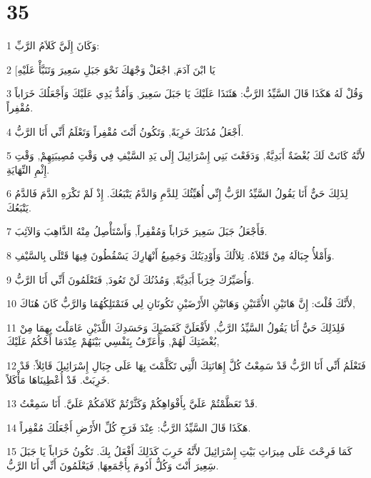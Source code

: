 \chapter{35}

\par 1 وَكَانَ إِلَيَّ كَلاَمُ الرَّبِّ:
\par 2 [يَا ابْنَ آدَمَ, اجْعَلْ وَجْهَكَ نَحْوَ جَبَلِ سَعِيرَ وَتَنَبَّأْ عَلَيْهِ
\par 3 وَقُلْ لَهُ هَكَذَا قَالَ السَّيِّدُ الرَّبُّ: هَئَنَذَا عَلَيْكَ يَا جَبَلَ سَعِيرَ, وَأَمُدُّ يَدِي عَلَيْكَ وَأَجْعَلُكَ خَرَاباً مُقْفِراً.
\par 4 أَجْعَلُ مُدُنَكَ خَرِبَةً, وَتَكُونُ أَنْتَ مُقْفِراً وَتَعْلَمُ أَنِّي أَنَا الرَّبُّ.
\par 5 لأَنَّهُ كَانَتْ لَكَ بُغْضَةٌ أَبَدِيَّةٌ, وَدَفَعْتَ بَنِي إِسْرَائِيلَ إِلَى يَدِ السَّيْفِ فِي وَقْتِ مُصِيبَتِهِمْ, وَقْتِ إِثْمِ النِّهَايَةِ.
\par 6 لِذَلِكَ حَيٌّ أَنَا يَقُولُ السَّيِّدُ الرَّبُّ إِنِّي أُهَيِّئُكَ لِلدَّمِ وَالدَّمُ يَتْبَعُكَ. إِذْ لَمْ تَكْرَهِ الدَّمَ فَالدَّمُ يَتْبَعُكَ.
\par 7 فَأَجْعَلُ جَبَلَ سَعِيرَ خَرَاباً وَمُقْفِراً, وَأَسْتَأْصِلُ مِنْهُ الذَّاهِبَ وَالآئِبَ.
\par 8 وَأَمْلأُ جِبَالَهُ مِنْ قَتْلاَهُ. تِلاَلُكَ وَأَوْدِيَتُكَ وَجَمِيعُ أَنْهَارِكَ يَسْقُطُونَ فِيهَا قَتْلَى بِالسَّيْفِ.
\par 9 وَأُصَيِّرُكَ خِرَباً أَبَدِيَّةً, وَمُدُنُكَ لَنْ تَعُودَ, فَتَعْلَمُونَ أَنِّي أَنَا الرَّبُّ.
\par 10 لأَنَّكَ قُلْتَ: إِنَّ هَاتَيْنِ الأُمَّتَيْنِ وَهَاتَيْنِ الأَرْضَيْنِ تَكُونَانِ لِي فَنَمْتَلِكُهُمَا وَالرَّبُّ كَانَ هُنَاكَ,
\par 11 فَلِذَلِكَ حَيٌّ أَنَا يَقُولُ السَّيِّدُ الرَّبُّ, لأَفْعَلَنَّ كَغَضَبِكَ وَحَسَدِكَ اللَّذَيْنِ عَامَلْتَ بِهِمَا مِنْ بُغْضَتِكَ لَهُمْ, وَأُعَرِّفُ بِنَفْسِي بَيْنَهُمْ عِنْدَمَا أَحْكُمُ عَلَيْكَ,
\par 12 فَتَعْلَمُ أَنِّي أَنَا الرَّبُّ قَدْ سَمِعْتُ كُلَّ إِهَانَتِكَ الَّتِي تَكَلَّمْتَ بِهَا عَلَى جِبَالِ إِسْرَائِيلَ قَائِلاً: قَدْ خَرِبَتْ. قَدْ أُعْطِينَاهَا مَأْكَلاً.
\par 13 قَدْ تَعَظَّمْتُمْ عَلَيَّ بِأَفْوَاهِكُمْ وَكَثَّرْتُمْ كَلاَمَكُمْ عَلَيَّ. أَنَا سَمِعْتُ.
\par 14 هَكَذَا قَالَ السَّيِّدُ الرَّبُّ: عِنْدَ فَرَحِ كُلِّ الأَرْضِ أَجْعَلُكَ مُقْفِراً.
\par 15 كَمَا فَرِحْتَ عَلَى مِيرَاثِ بَيْتِ إِسْرَائِيلَ لأَنَّهُ خَرِبَ كَذَلِكَ أَفْعَلُ بِكَ. تَكُونُ خَرَاباً يَا جَبَلَ سَِعِيرَ أَنْتَ وَكُلُّ أَدُومَ بِأَجْمَعِهَا, فَيَعْلَمُونَ أَنِّي أَنَا الرَّبُّ.

